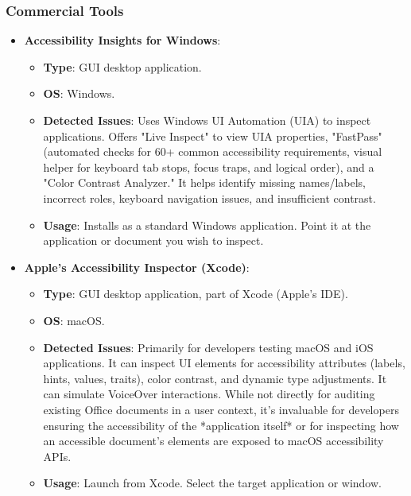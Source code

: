 \subsubsection{Commercial Tools}
\begin{itemize}
    \item \textbf{Accessibility Insights for Windows}\cite{InsightsWindows}:
        \begin{itemize}
            \item \textbf{Type}: GUI desktop application.
            \item \textbf{OS}: Windows.
            \item \textbf{Detected Issues}: Uses Windows UI Automation (UIA) to inspect applications. Offers "Live Inspect" to view UIA properties, "FastPass" (automated checks for 60+ common accessibility requirements, visual helper for keyboard tab stops, focus traps, and logical order), and a "Color Contrast Analyzer." It helps identify missing names/labels, incorrect roles, keyboard navigation issues, and insufficient contrast.
            \item \textbf{Usage}: Installs as a standard Windows application. Point it at the application or document you wish to inspect.
        \end{itemize}
    \item \textbf{Apple's Accessibility Inspector (Xcode)}\cite{AppleInspector}:
        \begin{itemize}
            \item \textbf{Type}: GUI desktop application, part of Xcode (Apple's IDE).
            \item \textbf{OS}: macOS.
            \item \textbf{Detected Issues}: Primarily for developers testing macOS and iOS applications. It can inspect UI elements for accessibility attributes (labels, hints, values, traits), color contrast, and dynamic type adjustments. It can simulate VoiceOver interactions. While not directly for auditing existing Office documents in a user context, it's invaluable for developers ensuring the accessibility of the *application itself* or for inspecting how an accessible document's elements are exposed to macOS accessibility APIs.
            \item \textbf{Usage}: Launch from Xcode. Select the target application or window.
        \end{itemize}
\end{itemize}

